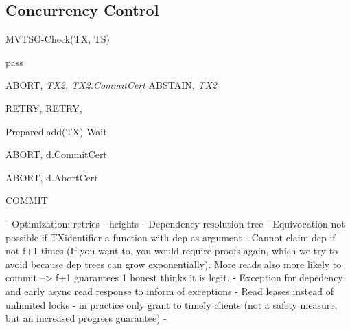 \subsection{Concurrency Control}
\begin{algorithm}
\caption{MVTSO-Check(TX, TS)}\label{euclid}
\begin{algorithmic}[1]
\State pass
\EndIf

          \State  \Return ABORT, \textit{TX2, TX2.CommitCert}
        \EndIf
          \State  \Return ABSTAIN, \textit{TX2}
        \EndIf
          
		   
        
        
\EndFor

          \State  \Return RETRY, %
        \EndIf
          \State  \Return RETRY, %
        \EndIf

\EndFor
\State Prepared.add(TX) 
\State Wait
\EndWhile

        	\State \Return ABORT, d.CommitCert
          	\EndIf
       
		\Else 
		\State \Return ABORT, d.AbortCert
		\EndIf
\EndFor


\State \Return COMMIT


\end{algorithmic}
\end{algorithm}


 - Optimization: retries - heights
 - Dependency resolution tree
 		- Equivocation not possible if TXidentifier a function with dep as argument
 		- Cannot claim dep if not f+1 times (If you want to, you would require proofs again, which we try to avoid because dep trees can grow exponentially). More reads also more likely to commit --> f+1 guarantees 1 honest thinks it is legit.
 - Exception for depedency and early async read response to inform of exceptions
 - Read leases instead of unlimited locks - in practice only grant to timely clients (not a safety measure, but an increased progress guarantee)
 - 
